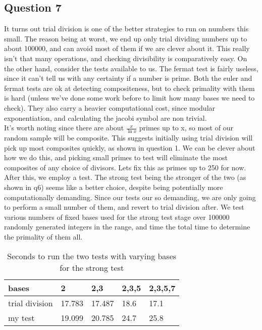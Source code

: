 \documentclass[10pt,a4paper]{report}
\begin{document}
\subsection*{Question 7}
It turns out trial division is one of the better strategies to run on numbers this small. The reason being at worst, we end up only trial dividing numbers up to about 100000, and can avoid most of them if we are clever about it. This really isn't that many operations, and checking divisibility is comparatively easy. On the other hand, consider the tests available to us. The fermat test is fairly useless, since it can't tell us with any certainty if a number is prime. Both the euler and fermat tests are ok at detecting compositeness, but to check primality with them is hard (unless we've done some work before to limit how many bases we need to check). They also carry a heavier computational cost, since modular exponentiation, and calculating the jacobi symbol are non trivial.\\

It's worth noting since there are about $\frac{x}{\ln{x}}$ primes up to x, so most of our random sample will be composite. This suggests initially using trial division will pick up most composites quickly, as shown in question 1. We can be clever about how we do this, and picking small primes to test will eliminate the most composites of any choice of divisors. Lets fix this as primes up to 250 for now. After this, we employ a test. The strong test being the stronger of the two (as shown in q6) seems like a better choice, despite being potentially more computationally demanding. Since our tests our so demanding, we are only going to perform a small number of them, and revert to trial division after. We test various numbers of fixed bases used for the strong test stage over 100000 randomly generated integers in the range, and time the total time to determine the primality of them all.\\

\begin{table}[ht]
\centering
\begin{tabular}{|l|l|l|l|l|}
\hline
    bases           & 2      & 2,3    & 2,3,5 & 2,3,5,7 \\ \hline
trial division & 17.783 & 17.487 & 18.6  & 17.1    \\ \hline
my test        & 19.099 & 20.785 & 24.7  & 25.8    \\ \hline
\end{tabular}
\caption{Seconds to run the two tests with varying bases for the strong test}
\end{table}
\end{document}
